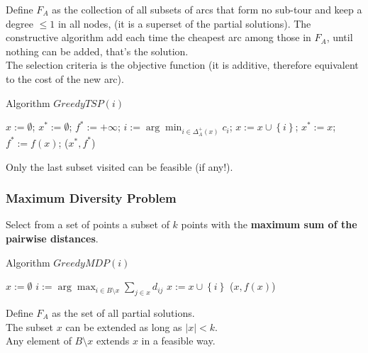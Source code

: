 Define $F_A$ as the collection of all subsets of arcs that form no sub-tour and keep a degree $\leq 1$ in all nodes, (it is a superset of the partial solutions). The constructive algorithm add each time the cheapest arc among those in $F_A$, until nothing can be added, that's the solution.\\

The selection criteria is the objective function (it is additive, therefore equivalent to the cost of the new arc).

\begin{algorithm}
	\caption{Algorithm $GreedyTSP(i)$}
	\begin{algorithmic}
		\STATE $x := \emptyset$; $x^\ast := \emptyset$;
		\STATE $f^\ast := + \infty$;
		\STATE $i := \arg \min_{i \in \Delta_A^+ (x)} c_i$;
		\STATE $x := x \cup \left\{i\right\}$;
		\ENDWHILE
		\STATE $x^\ast := x$; $f^\ast := f(x)$;
		\ENDIF
		\RETURN ($x^\ast, f^\ast$)
	\end{algorithmic}
\end{algorithm}
Only the last subset visited can be feasible (if any!).\\

\newpage

\subsubsection{Maximum Diversity Problem}
Select from a set of points a subset of $k$ points with the \textbf{maximum sum of the pairwise distances}.\\

\begin{algorithm}
	\caption{Algorithm $GreedyMDP(i)$}
	\begin{algorithmic}
		\STATE $x := \emptyset$
		\WHILE{$|x| < k$}
		\STATE $i := \arg \max_{i \in B \setminus x} \sum_{j \in x} d_{ij}$
		\STATE $x := x \cup \left\{i\right\}$
		\ENDWHILE
		\RETURN ($x, f(x)$)
	\end{algorithmic}
\end{algorithm}

Define $F_A$ as the set of all partial solutions.\\

The subset $x$ can be extended as long as $|x| < k$.\\

Any element of $B \setminus x$ extends $x$ in a feasible way.\\

